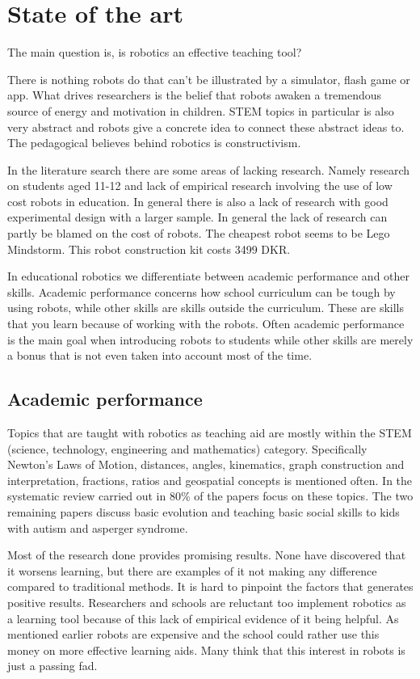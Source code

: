 \section*{State of the art}
The main question is, is robotics an effective teaching tool?

\bigskip\noindent
There is nothing robots do that can't be illustrated by a simulator, flash game or app. What drives researchers is the belief that robots awaken a tremendous source of energy and motivation in children. STEM topics in particular is also very abstract and robots give a concrete idea to connect these abstract ideas to. The pedagogical believes behind robotics is constructivism. 

\bigskip\noindent
In the literature search there are some areas of lacking research. Namely research on students aged 11-12 and lack of empirical research involving the use of low cost robots in education. In general there is also a lack of research with good experimental design with a larger sample. In general the lack of research can partly be blamed on the cost of robots. The cheapest robot seems to be Lego Mindstorm. This robot construction kit costs 3499 DKR. 

\bigskip\noindent
In educational robotics we differentiate between academic performance and other skills. Academic performance concerns how school curriculum can be tough by using robots, while other skills are skills outside the curriculum. These are skills that you learn because of working with the robots. Often academic performance is the main goal when introducing robots to students while other skills are merely a bonus that is not even taken into account most of the time. 

\subsection*{Academic performance}

Topics that are taught with robotics as teaching aid are mostly within the STEM (science, technology, engineering and mathematics) category. Specifically Newton's Laws of Motion, distances, angles, kinematics, graph construction and interpretation, fractions, ratios and geospatial concepts is mentioned often. In the systematic review carried out in \cite{Benitti2012978} 80\% of the papers focus on these topics. The two remaining papers discuss basic evolution and teaching basic social skills to kids with autism and asperger syndrome. 

\bigskip\noindent
Most of the research done provides promising results. None have discovered that it worsens learning, but there are examples of it not making any difference compared to traditional methods. It is hard to pinpoint the factors that generates positive results. Researchers and schools are reluctant too implement robotics as a learning tool because of this lack of empirical evidence of it being helpful. As mentioned earlier robots are expensive and the school could rather use this money on more effective learning aids. Many think that this interest in robots is just a passing fad. 


